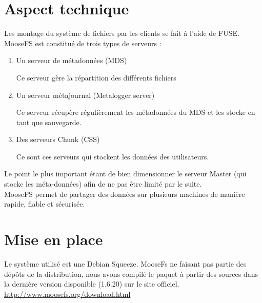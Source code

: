 \documentclass[12pt]{report}
\begin{document}
			\section{Aspect technique}
				
				Les montage du système de fichiers par les clients se fait à l'aide de FUSE.
				MooseFS est constitué de trois types de serveurs :

				\begin{enumerate}
					\item Un serveur de métadonnées (MDS)

					Ce serveur gère la répartition des différents fichiers
					\item Un serveur métajournal (Metalogger server)

					Ce serveur récupère régulièrement les métadonnées du MDS et les stocke en tant que sauvegarde.
					\item Des serveurs Chunk (CSS) %

					Ce sont ces serveurs qui stockent les données des utilisateurs.
				\end{enumerate}
				
				Le point le plus important étant de bien dimensionner le serveur Master (qui stocke les méta-données)
				afin de ne pas être limité par le suite.\\

				MooseFS permet de partager des données sur plusieurs machines de manière rapide, fiable et sécurisée.

		\section{Mise en place}

Le système utilisé est une Debian Squeeze. MooseFs ne faisant pas partie des dépôts de la distribution, nous avons compilé le paquet à partir des sources dans la dernière version disponible (1.6.20) sur le site officiel.\\
\href{http://pro.hit.gemius.pl/hitredir/id=0sWa0S8ft4sTAHF1bGAAEZPcP3ziyq7f9SdhoQf7oeT.c7/url=moosefs.org/tl\_files/mfscode/mfs-1.6.20-2.tar.gz}{http://www.moosefs.org/download.html} \\\\
\end{document}
